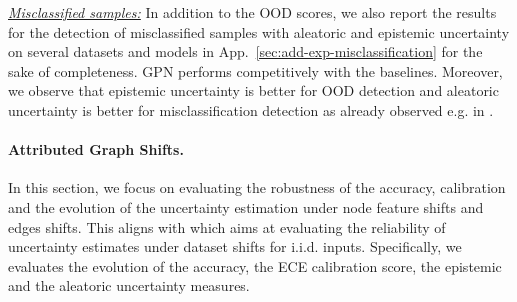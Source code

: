 \textit{\underline{Misclassified samples:}} In addition to the OOD scores, we also report the results for the detection of misclassified samples with aleatoric and epistemic uncertainty on several datasets and models in App.~\ref{sec:add-exp-misclassification} for the sake of completeness. GPN performs competitively with the baselines. Moreover, we observe that epistemic uncertainty is better for OOD detection and aleatoric uncertainty is better for misclassification detection as already observed  e.g. in \citep{Zhao2020}.




\paragraph{Attributed Graph Shifts.} In this section, we focus on evaluating the robustness of the accuracy, calibration and the evolution of the uncertainty estimation under node feature shifts and edges shifts. This aligns with \citep{Ovadia2019} which aims at evaluating the reliability of uncertainty estimates under dataset shifts for i.i.d. inputs. Specifically, we evaluates the evolution of the accuracy, the ECE \citep{Naeini2015} calibration score, the epistemic and the aleatoric uncertainty measures. 


